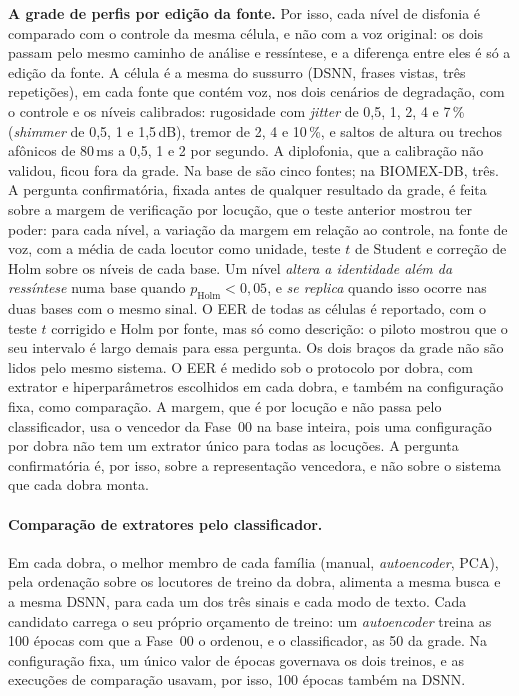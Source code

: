 				\par \textbf{A grade de perfis por edição da fonte.} Por isso, cada nível de disfonia é comparado com o controle da mesma célula, e não com a voz original: os dois passam pelo mesmo caminho de análise e ressíntese, e a diferença entre eles é só a edição da fonte. A célula é a mesma do sussurro (\ac{DSNN}, frases vistas, três repetições), em cada fonte que contém voz, nos dois cenários de degradação, com o controle e os  níveis calibrados: rugosidade com \textit{jitter} de 0,5, 1, 2, 4 e 7\,\% (\textit{shimmer} de 0,5, 1 e 1,5\,dB), tremor de 2, 4 e 10\,\%, e saltos de altura ou trechos afônicos de 80\,ms a 0,5, 1 e 2 por segundo. A diplofonia, que a calibração não validou, ficou fora da grade. Na base de  são cinco fontes; na BIOMEX-DB, três. A pergunta confirmatória, fixada antes de qualquer resultado da grade, é feita sobre a margem de verificação por locução, que o teste anterior mostrou ter poder: para cada nível, a variação da margem em relação ao controle, na fonte de voz, com a média de cada locutor como unidade, teste $t$ de Student e correção de Holm sobre os  níveis de cada base. Um nível \emph{altera a identidade além da ressíntese} numa base quando $p_{\text{Holm}} < 0{,}05$, e \emph{se replica} quando isso ocorre nas duas bases com o mesmo sinal. O \ac{EER} de todas as células é reportado, com o teste $t$ corrigido e Holm por fonte, mas só como descrição: o piloto mostrou que o seu intervalo é largo demais para essa pergunta. Os dois braços da grade não são lidos pelo mesmo sistema. O \ac{EER} é medido sob o protocolo por dobra, com extrator e hiperparâmetros escolhidos em cada dobra, e também na configuração fixa, como comparação. A margem, que é por locução e não passa pelo classificador, usa o vencedor da Fase~00 na base inteira, pois uma configuração por dobra não tem um extrator único para todas as locuções. A pergunta confirmatória é, por isso, sobre a representação vencedora, e não sobre o sistema que cada dobra monta.

				\paragraph{Comparação de extratores pelo classificador.} Em cada dobra, o melhor membro de cada família (manual, \textit{autoencoder}, \ac{PCA}), pela ordenação sobre os locutores de treino da dobra, alimenta a mesma busca e a mesma \ac{DSNN}, para cada um dos três sinais e cada modo de texto. Cada candidato carrega o seu próprio orçamento de treino: um \textit{autoencoder} treina as 100 épocas com que a Fase~00 o ordenou, e o classificador, as 50 da grade. Na configuração fixa, um único valor de épocas governava os dois treinos, e as execuções de comparação usavam, por isso, 100 épocas também na \ac{DSNN}.

